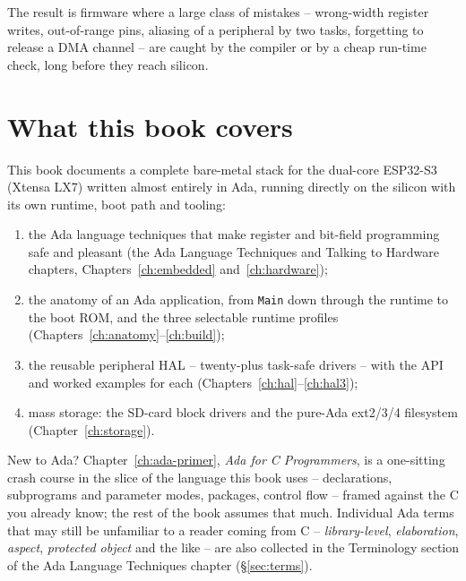 The result is firmware where a large class of mistakes -- wrong-width register
writes, out-of-range pins, aliasing of a peripheral by two tasks, forgetting to
release a DMA channel -- are caught by the compiler or by a cheap run-time
check, long before they reach silicon.

\section{What this book covers}

This book documents a complete bare-metal stack for the dual-core ESP32-S3
(Xtensa LX7) written almost entirely in Ada, running directly on the silicon
with its own runtime, boot path and tooling:

\begin{enumerate}
\item the Ada language techniques that make register and bit-field programming
  safe and pleasant (the Ada Language Techniques and Talking to Hardware
  chapters, Chapters~\ref{ch:embedded} and~\ref{ch:hardware});
\item the anatomy of an Ada application, from \texttt{Main} down through the
  runtime to the boot ROM, and the three selectable runtime profiles
  (Chapters~\ref{ch:anatomy}--\ref{ch:build});
\item the reusable peripheral HAL -- twenty-plus task-safe drivers -- with the
  API and worked examples for each (Chapters~\ref{ch:hal}--\ref{ch:hal3});
\item mass storage: the SD-card block drivers and the pure-Ada ext2/3/4
  filesystem (Chapter~\ref{ch:storage}).
\end{enumerate}

New to Ada? Chapter~\ref{ch:ada-primer}, \emph{Ada for C Programmers}, is a
one-sitting crash course in the slice of the language this book uses --
declarations, subprograms and parameter modes, packages, control flow -- framed
against the C you already know; the rest of the book assumes that much. Individual
Ada terms that may still be unfamiliar to a reader coming from C --
\emph{library-level}, \emph{elaboration}, \emph{aspect}, \emph{protected object}
and the like -- are also collected in the Terminology section of the Ada Language
Techniques chapter (\S\ref{sec:terms}).

